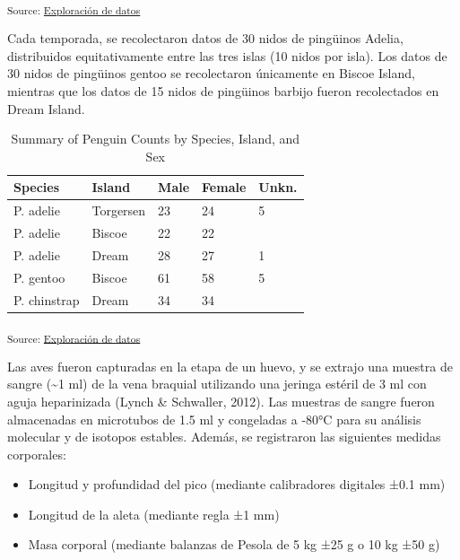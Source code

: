 \documentclass[
]{agujournal2019}
\providecommand{\tightlist}{%
  \setlength{\itemsep}{0pt}\setlength{\parskip}{0pt}}\usepackage{longtable,booktabs,array}
\begin{document}
\textsubscript{Source:
\href{https://sofiazorrilla.github.io/Penguin_ms/notebooks/DataExploration-preview.html\#cell-fig-mapa-distribucion}{Exploración
de datos}}

Cada temporada, se recolectaron datos de 30 nidos de pingüinos Adelia,
distribuidos equitativamente entre las tres islas (10 nidos por isla).
Los datos de 30 nidos de pingüinos gentoo se recolectaron únicamente en
Biscoe Island, mientras que los datos de 15 nidos de pingüinos barbijo
fueron recolectados en Dream Island.

\begin{longtable}[]{@{}lllll@{}}

\caption{\label{tbl-sampling}Summary of Penguin Counts by Species,
Island, and Sex}

\tabularnewline

\toprule\noalign{}
Species & Island & Male & Female & Unkn. \\
\midrule\noalign{}
\endhead
\bottomrule\noalign{}
\endlastfoot
P. adelie & Torgersen & 23 & 24 & 5 \\
P. adelie & Biscoe & 22 & 22 & \\
P. adelie & Dream & 28 & 27 & 1 \\
P. gentoo & Biscoe & 61 & 58 & 5 \\
P. chinstrap & Dream & 34 & 34 & \\

\end{longtable}

\textsubscript{Source:
\href{https://sofiazorrilla.github.io/Penguin_ms/notebooks/DataExploration-preview.html\#cell-tbl-sampling}{Exploración
de datos}}

Las aves fueron capturadas en la etapa de un huevo, y se extrajo una
muestra de sangre (\textasciitilde1 ml) de la vena braquial utilizando
una jeringa estéril de 3 ml con aguja heparinizada (Lynch \& Schwaller,
2012). Las muestras de sangre fueron almacenadas en microtubos de 1.5 ml
y congeladas a -80°C para su análisis molecular y de isotopos estables.
Además, se registraron las siguientes medidas corporales:

\begin{itemize}
\tightlist
\item
  Longitud y profundidad del pico (mediante calibradores digitales ±0.1
  mm)\\
\item
  Longitud de la aleta (mediante regla ±1 mm)\\
\item
  Masa corporal (mediante balanzas de Pesola de 5 kg ±25 g o 10 kg ±50
  g)
\end{itemize}
\end{document}
